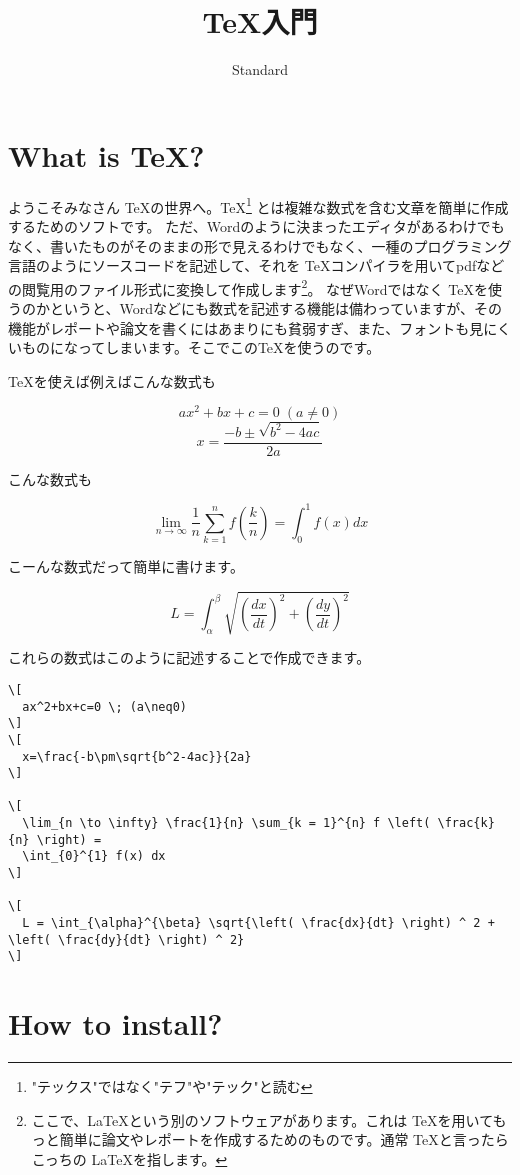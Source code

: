 \documentclass[paper=b5j]{jlreq}
\begin{document}
\title{\TeX 入門}
\author{Standard}
\maketitle

\section{What is \TeX ?}

ようこそみなさん \TeX の世界へ。\TeX \footnote{"テックス"ではなく"テフ"や"テック"と読む} とは複雑な数式を含む文章を簡単に作成するためのソフトです。
ただ、Wordのように決まったエディタがあるわけでもなく、書いたものがそのままの形で見えるわけでもなく、一種のプログラミング言語のようにソースコードを記述して、それを \TeX コンパイラを用いてpdfなどの閲覧用のファイル形式に変換して作成します\footnote{ここで、\LaTeX という別のソフトウェアがあります。これは \TeX を用いてもっと簡単に論文やレポートを作成するためのものです。通常 \TeX と言ったらこっちの \LaTeX を指します。}。
なぜWordではなく \TeX を使うのかというと、Wordなどにも数式を記述する機能は備わっていますが、その機能がレポートや論文を書くにはあまりにも貧弱すぎ、また、フォントも見にくいものになってしまいます。そこでこの\TeX を使うのです。

\TeX を使えば例えばこんな数式も

\[
  ax^2+bx+c=0 \; (a\neq0)
\]
\[
  x=\frac{-b\pm\sqrt{b^2-4ac}}{2a}
\]

こんな数式も

\[
  \lim_{n \to \infty} \frac{1}{n} \sum_{k = 1}^{n} f \left( \frac{k}{n} \right) =
  \int_{0}^{1} f(x) dx
\]

こーんな数式だって簡単に書けます。

\[
  L = \int_{\alpha}^{\beta} \sqrt{\left( \frac{dx}{dt} \right) ^ 2 + \left( \frac{dy}{dt} \right) ^ 2}
\]

これらの数式はこのように記述することで作成できます。

\begin{lstlisting}[caption=LaTeX]
\[
  ax^2+bx+c=0 \; (a\neq0)
\]
\[
  x=\frac{-b\pm\sqrt{b^2-4ac}}{2a}
\]

\[
  \lim_{n \to \infty} \frac{1}{n} \sum_{k = 1}^{n} f \left( \frac{k}{n} \right) =
  \int_{0}^{1} f(x) dx
\]

\[
  L = \int_{\alpha}^{\beta} \sqrt{\left( \frac{dx}{dt} \right) ^ 2 + \left( \frac{dy}{dt} \right) ^ 2}
\]
\end{lstlisting}

\section{How to install?}
\end{document}
